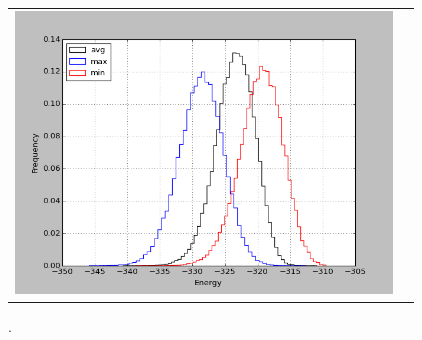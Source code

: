 \documentclass[a4paper,12pt]{article}
\begin{document}
    \begin{figure}[h]
      \centering
      \begin{tabular}{cc} 
        \includegraphics[width=10cm]{graphe/histo2_aa_Tambiante.png} &
      \end{tabular}
      
      \caption{.}
      \label{temps_CPU}
    \end{figure}

    \clearpage
\end{document}

